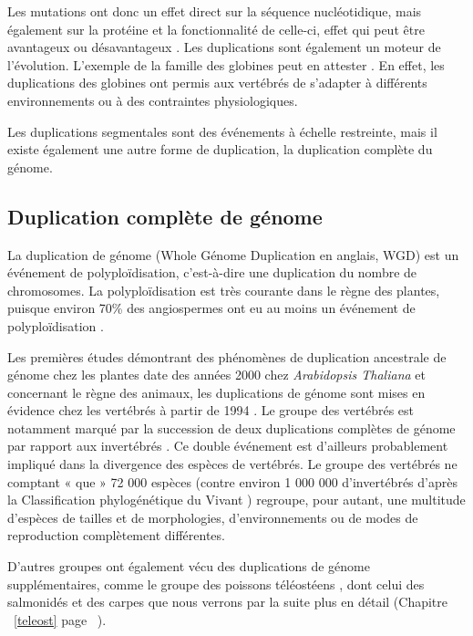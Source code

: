 \par Les mutations ont donc un effet direct sur la séquence nucléotidique, mais également sur la protéine et la fonctionnalité de celle-ci, effet qui peut être avantageux ou désavantageux \parencite{long_origin_2003}. Les duplications sont également un moteur de l’évolution. L’exemple de la famille des globines peut en attester \parencite{weatherall_molecular_1976}. En effet, les duplications des globines ont permis aux vertébrés de s’adapter à différents environnements ou à des contraintes physiologiques. 
\par Les duplications segmentales sont des événements à échelle restreinte, mais il existe également une autre forme de duplication, la duplication complète du génome.


\subsection{Duplication complète de génome}\label{wgd}
\par La duplication de génome (Whole Génome Duplication en anglais, WGD) est un événement de polyploïdisation, c’est-à-dire une duplication du nombre de chromosomes. La polyploïdisation est très courante dans le règne des plantes, puisque environ 70\% des angiospermes ont eu au moins un événement de polyploïdisation \parencite{masterson_stomatal_1994, soltis_polyploidy_2009}.
\par Les premières études démontrant des phénomènes de duplication ancestrale de génome chez les plantes date des années 2000 chez \textit{Arabidopsis Thaliana} \parencite{blanc_recent_2003, bowers_unravelling_2003, the_arabidopsis_genome_initiative_analysis_2000} et concernant le règne des animaux, les duplications de génome sont mises en évidence chez les vertébrés à partir de 1994 \parencite{holland_gene_1994, nakatani_reconstruction_2007}. Le groupe des vertébrés est notamment marqué par la succession de deux duplications complètes de génome par rapport aux invertébrés \parencite{dehal_two_2005}. Ce double événement est d’ailleurs probablement impliqué dans la divergence des espèces de vertébrés. Le groupe des vertébrés ne comptant « que » 72 000 espèces (contre environ 1 000 000 d’invertébrés d’après la Classification phylogénétique du Vivant \parencite{lecointre_classification_2016}) regroupe, pour autant, une multitude d’espèces de tailles et de morphologies, d’environnements ou de modes de reproduction complètement différentes.
\par D’autres groupes ont également vécu des duplications de génome supplémentaires, comme le groupe des poissons téléostéens \parencite{braasch_polyploidy_2012, meyer_2r_2005}, dont celui des salmonidés et des carpes \parencite{lien_atlantic_2016, xu_allotetraploid_2019} que nous verrons par la suite plus en détail (Chapitre  ~\ref{teleost} page ~\pageref{teleost}). 
